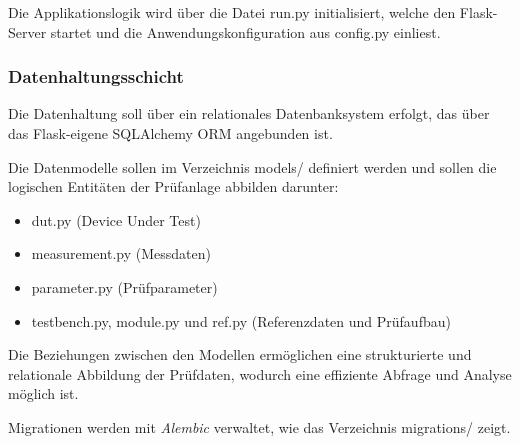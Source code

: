 Die Applikationslogik wird über die Datei run.py initialisiert, welche den Flask-Server startet und die Anwendungskonfiguration aus config.py einliest.


\subsubsection{Datenhaltungsschicht}

Die Datenhaltung soll  über ein relationales Datenbanksystem erfolgt, das über das Flask-eigene SQLAlchemy \ac{ORM} angebunden ist.

Die Datenmodelle sollen im Verzeichnis models/ definiert werden und sollen die logischen Entitäten der Prüfanlage abbilden darunter:

\begin{itemize}

\item
dut.py (Device Under Test)

\item
measurement.py (Messdaten)

\item
parameter.py (Prüfparameter)

\item
testbench.py, module.py und ref.py (Referenzdaten und Prüfaufbau)

\end{itemize}

Die Beziehungen zwischen den Modellen ermöglichen eine strukturierte und relationale Abbildung der Prüfdaten, wodurch eine effiziente Abfrage und Analyse möglich ist.

Migrationen werden mit \textit{Alembic} verwaltet, wie das Verzeichnis migrations/ zeigt.











